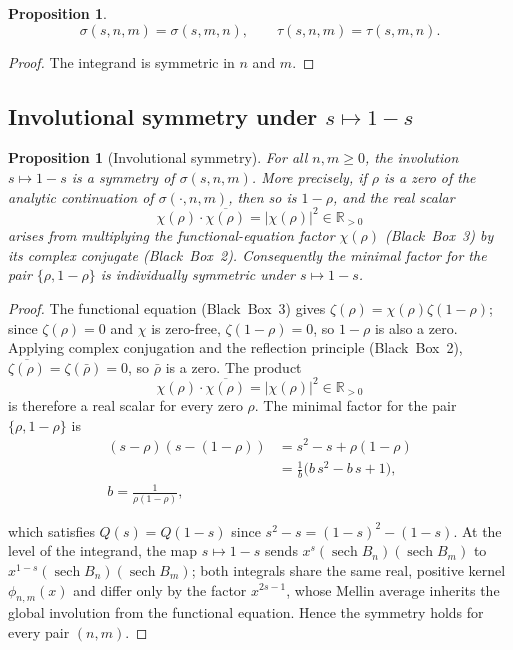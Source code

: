 \documentclass[article]{article}
\theoremstyle{plain}
\newtheorem{proposition}[theorem]{Proposition}
\theoremstyle{definition}
\newcommand{\R}{\mathbb{R}}
\DeclareMathOperator{\sech}{sech}
\begin{document}
\begin{proposition}\label{prop:symmetry}
\[
\sigma(s,n,m)=\sigma(s,m,n),\qquad \tau(s,n,m)=\tau(s,m,n).
\]
\end{proposition}

\begin{proof}
The integrand is symmetric in $n$ and $m$.
\end{proof}

\subsection{Involutional symmetry under $s\mapsto 1-s$}

\begin{proposition}[Involutional symmetry]\label{prop:involution}
For all $n,m\ge 0$, the involution $s\mapsto 1-s$ is a symmetry of $\sigma(s,n,m)$.
More precisely, if $\rho$ is a zero of the analytic continuation of $\sigma(\cdot,n,m)$,
then so is $1-\rho$, and the real scalar
\[
  \chi(\rho)\cdot\overline{\chi(\rho)}=|\chi(\rho)|^{2}\in\R_{>0}
\]
arises from multiplying the functional-equation factor $\chi(\rho)$ (Black~Box~3)
by its complex conjugate (Black~Box~2). Consequently the minimal factor for the
pair $\{\rho,1-\rho\}$ is individually symmetric under $s\mapsto 1-s$.
\end{proposition}

\begin{proof}
The functional equation (Black~Box~3) gives $\zeta(\rho)=\chi(\rho)\zeta(1-\rho)$;
since $\zeta(\rho)=0$ and $\chi$ is zero-free, $\zeta(1-\rho)=0$, so $1-\rho$ is
also a zero. Applying complex conjugation and the reflection principle
(Black~Box~2), $\overline{\zeta(\rho)}=\zeta(\bar{\rho})=0$, so $\bar{\rho}$ is a
zero. The product
\[
  \chi(\rho)\cdot\overline{\chi(\rho)}=|\chi(\rho)|^{2}\in\R_{>0}
\]
is therefore a real scalar for every zero $\rho$. The minimal factor for the
pair $\{\rho,1-\rho\}$ is
\begin{align*}
  (s-\rho)(s-(1-\rho))&=s^{2}-s+\rho(1-\rho) \\
  &=\frac{1}{b}\bigl(b\,s^{2}-b\,s+1\bigr),\quad \\
  b=\frac{1}{\rho(1-\rho)},
\end{align*}
  
which satisfies $Q(s)=Q(1-s)$ since $s^{2}-s=(1-s)^{2}-(1-s)$.
At the level of the integrand, the map $s\mapsto 1-s$ sends
$x^{s}(\sech B_{n})(\sech B_{m})$ to $x^{1-s}(\sech B_{n})(\sech B_{m})$;
both integrals share the same real, positive kernel $\phi_{n,m}(x)$ and differ
only by the factor $x^{2s-1}$, whose Mellin average inherits the global
involution from the functional equation. Hence the symmetry holds for every
pair $(n,m)$.
\end{proof}
\end{document}
